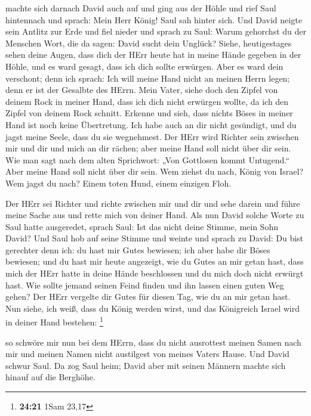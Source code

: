  machte sich darnach David auch auf und ging aus der Höhle
und rief Saul hintennach und sprach: Mein Herr König! Saul sah hinter
sich. Und David neigte sein Antlitz zur Erde und fiel nieder
 und sprach zu Saul: Warum gehorchst du der Menschen
Wort, die da sagen: David sucht dein Unglück?  Siehe,
heutigestages sehen deine Augen, dass dich der HErr heute hat in meine
Hände gegeben in der Höhle, und es ward gesagt, dass ich dich sollte
erwürgen. Aber es ward dein verschont; denn ich sprach: Ich will meine
Hand nicht an meinen Herrn legen; denn er ist der Gesalbte des HErrn.
 Mein Vater, siehe doch den Zipfel von deinem Rock in
meiner Hand, dass ich dich nicht erwürgen wollte, da ich den Zipfel von
deinem Rock schnitt. Erkenne und sieh, dass nichts Böses in meiner Hand
ist noch keine Übertretung. Ich habe auch an dir nicht gesündigt, und du
jagst meine Seele, dass du sie wegnehmest.  Der HErr wird
Richter sein zwischen mir und dir und mich an dir rächen; aber meine
Hand soll nicht über dir sein.  Wie man sagt nach dem
alten Sprichwort: „Von Gottlosen kommt Untugend.`` Aber meine Hand soll
nicht über dir sein.  Wem ziehst du nach, König von
Israel? Wem jagst du nach? Einem toten Hund, einem einzigen Floh.

 Der HErr sei Richter und richte zwischen mir und dir und
sehe darein und führe meine Sache aus und rette mich von deiner Hand.
 Als nun David solche Worte zu Saul hatte ausgeredet,
sprach Saul: Ist das nicht deine Stimme, mein Sohn David? Und Saul hob
auf seine Stimme und weinte  und sprach zu David: Du bist
gerechter denn ich: du hast mir Gutes bewiesen; ich aber habe dir Böses
bewiesen;  und du hast mir heute angezeigt, wie du Gutes
an mir getan hast, dass mich der HErr hatte in deine Hände beschlossen
und du mich doch nicht erwürgt hast.  Wie sollte jemand
seinen Feind finden und ihn lassen einen guten Weg gehen? Der HErr
vergelte dir Gutes für diesen Tag, wie du an mir getan hast.
 Nun siehe, ich weiß, dass du König werden wirst, und das
Königreich Israel wird in deiner Hand bestehen: \footnote{\textbf{24:21}
  1Sam 23,17}

 so schwöre mir nun bei dem HErrn, dass du nicht
ausrottest meinen Samen nach mir und meinen Namen nicht austilgest von
meines Vaters Hause.  Und David schwur Saul. Da zog Saul
heim; David aber mit seinen Männern machte sich hinauf auf die Berghöhe.


